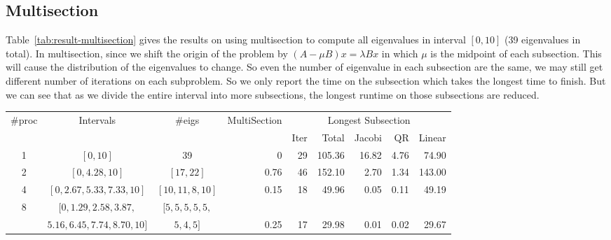 \subsection{Multisection}
Table~\ref{tab:result-multisection} gives the results on using multisection to compute all eigenvalues in interval $[0, 10]$ (39 eigenvalues in total). In multisection, since we shift the origin of the problem by $(A - \mu B) x = \lambda B x$ in which $\mu$ is the midpoint of each subsection. This will cause the distribution of the eigenvalues to change. So even the number of eigenvalue in each subsection are the same, we may still get different number of iterations on each subproblem. So we only report the time on the subsection which takes the longest time to finish. But we can see that as we divide the entire interval into more subsections, the longest runtime on those subsections are reduced. 

\begin{table*}
\begin{center}
\begin{tabular}{|c | c | c | r | r | r | r | r | r |}
\hline
$\#$proc & Intervals & $\#$eigs & MultiSection & \multicolumn{5}{|c|}{Longest Subsection} \\
  & & &  & Iter & Total & Jacobi & QR & Linear \\
\hline
1 & $[0, 10]$ & 39 & 0 & 29 & 105.36 & 16.82 & 4.76 & 74.90 \\
2 & $[0, 4.28, 10]$ & $[17, 22]$ & 0.76 &  46 & 152.10 & 2.70 & 1.34 & 143.00\\
4 & $[0, 2.67, 5.33, 7.33, 10]$ & $[10, 11, 8, 10]$ & 0.15 & 18 & 49.96 & 0.05 & 0.11 & 49.19 \\
8 &$[0, 1.29, 2.58, 3.87, $ & $[5, 5, 5, 5, 5,$ & &  & & & & \\
& $5.16, 6.45, 7.74, 8.70, 10]$& $5, 4, 5]$& 0.25 & 17 & 29.98 & 0.01 & 0.02 & 29.67\\
\hline
\end{tabular}
\caption{Multisection result on $[0, 10]$ for the $10000 \times 10000$ generated matrix $A$ and $B$.}
\label{tab:result-multisection}
\end{center}
\end{table*}


